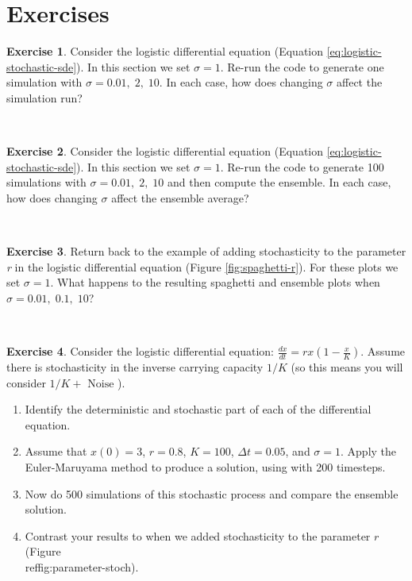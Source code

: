 \documentclass[
]{book}
\theoremstyle{definition}
\theoremstyle{definition}
\theoremstyle{definition}
\newtheorem{exercise}{Exercise}[chapter]
\theoremstyle{remark}
\begin{document}
\hypertarget{exercises-11}{%
\section{Exercises}\label{exercises-11}}

\begin{exercise}
\protect\hypertarget{exr:unnamed-chunk-340}{}{\label{exr:unnamed-chunk-340} }Consider the logistic differential equation (Equation \eqref{eq:logistic-stochastic-sde}). In this section we set \(\sigma = 1\). Re-run the code to generate one simulation with \(\sigma = 0.01, \; 2, \; 10\). In each case, how does changing \(\sigma\) affect the simulation run?
\end{exercise}

~

\begin{exercise}
\protect\hypertarget{exr:unnamed-chunk-341}{}{\label{exr:unnamed-chunk-341} }Consider the logistic differential equation (Equation \eqref{eq:logistic-stochastic-sde}). In this section we set \(\sigma = 1\). Re-run the code to generate 100 simulations with \(\sigma = 0.01, \; 2, \; 10\) and then compute the ensemble. In each case, how does changing \(\sigma\) affect the ensemble average?
\end{exercise}

~

\begin{exercise}
\protect\hypertarget{exr:unnamed-chunk-342}{}{\label{exr:unnamed-chunk-342} }Return back to the example of adding stochasticity to the parameter \emph{r} in the logistic differential equation (Figure \ref{fig:spaghetti-r}). For these plots we set \(\sigma = 1\). What happens to the resulting spaghetti and ensemble plots when \(\sigma = 0.01, \; 0.1, \; 10\)?
\end{exercise}

~

\begin{exercise}
\protect\hypertarget{exr:unnamed-chunk-343}{}{\label{exr:unnamed-chunk-343} }Consider the logistic differential equation: \(\displaystyle \frac{dx}{dt} = r x \left( 1-\frac{x}{K} \right)\). Assume there is stochasticity in the inverse carrying capacity \(1/K\) (so this means you will consider \(1/K + \mbox{ Noise }\)).

\begin{enumerate}[label=\alph*.]
\item Identify the deterministic and stochastic part of each of the differential equation.
\item Assume that $x(0)=3$,  $r=0.8$, $K=100$, $\Delta t = 0.05$, and $\sigma=1$. Apply the Euler-Maruyama method to produce a solution, using with 200 timesteps.
\item Now do 500 simulations of this stochastic process and compare the ensemble solution.
\item Contrast your results to when we added stochasticity to the parameter $r$ (Figure \\ref{fig:parameter-stoch}).
\end{enumerate}
\end{exercise}
\end{document}
